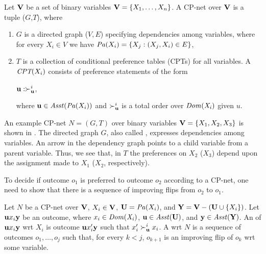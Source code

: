 \begin{definition}
\label{def:cpn}
	Let $\textbf{V}$ be a set of binary variables $\textbf{V}=\{X_1,\ldots,X_n\}$.
	A CP-net over $\textbf{V}$ is a tuple ($G$,$T$), where
	\begin{enumerate} \itemsep -4pt
		\item $G$ is a directed graph ($V,E$) specifying
					dependencies among variables,
					where for every $X_i \in V$ we have
					$\mathit{Pa}(X_i)=\{X_j:(X_j,X_i) \in E\}$,
		\item $T$ is a collection of 
					conditional preference tables (CPTs) for
					all variables.  A $\textit{CPT}(X_i)$ consists of preference
					statements of the form
					\begin{center}
						$\textbf{u} : \succ^i_{\textbf{u}}$,
					\end{center}
					where $\textbf{u} \in \mathit{Asst}(\mathit{Pa}(X_i))$ and $\succ^i_{\textbf{u}}$
					is a total order over $\it{Dom}(X_i)$ given $u$.
	\end{enumerate}
\end{definition}

An example CP-net $N=(G,T)$ over binary variables $\textbf{V}=\{X_1,X_2,X_3\}$
is shown in .
The directed graph $G$, also called , expresses
dependencies among variables.  An arrow in the dependency graph points
to a child variable from a parent variable. Thus, we see that, in $T$
the preferences on $X_2$ ($X_3$) depend upon the assignment made
to $X_1$ ($X_2$, respectively).

To decide if outcome $o_1$ is preferred to outcome $o_2$ according to a CP-net,
one need to show that there is a sequence of improving flips
from $o_2$ to $o_1$.

\begin{definition}
	Let $N$ be a CP-net over $\textbf{V}$, $X_i \in \textbf{V}$, $\textbf{U} = \mathit{Pa}(X_i)$,
	and $\textbf{Y}=\textbf{V}-(\textbf{U} \cup \{X_i\})$.
	Let $\textbf{u} x_i \textbf{y}$ be an outcome, where $x_i\in \it{Dom}(X_i)$,
	$\textbf{u} \in \mathit{Asst}(\textbf{U})$, and $\textbf{y} \in \mathit{Asst}(\textbf{Y})$.
	An  of $\textbf{u} x_i \textbf{y}$ wrt $X_i$ is
	outcome $\textbf{u} x_i' \textbf{y}$ such that $x_i' \succ^i_{\textbf{u}} x_i$.
	A  wrt $N$ is a sequence of
	outcomes $o_1,\ldots,o_j$ such that, for every $k<j$,
	$o_{k+1}$ is an improving flip of $o_k$ wrt some variable.
\end{definition}


